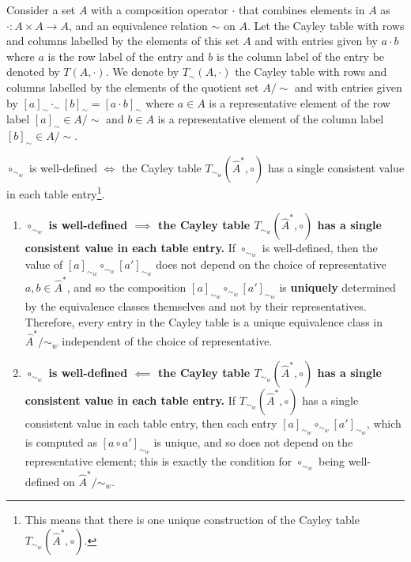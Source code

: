 Consider a set $A$ with a composition operator $\cdot$ that combines elements in $A$ as $\cdot: A \times A \to A$, and an equivalence relation $\sim$ on $A$.
Let the Cayley table with rows and columns labelled by the elements of this set $A$ and with entries given by $a \cdot b$ where $a$ is the row label of the entry and $b$ is the column label of the entry be denoted by $T(A, \cdot)$.
We denote by $T_{\sim}(A, \cdot)$ the Cayley table with rows and columns labelled by the elements of the quotient set $A/\sim$ and with entries given by $[a]_{\sim} \cdot_{\sim} [b]_{\sim} = [a \cdot b]_{\sim}$ where $a \in A$ is a representative element of the row label $[a]_{\sim} \in A/\sim$ and $b \in A$ is a representative element of the column label $[b]_{\sim} \in A/\sim$.


\begin{propositionE}\label{prp:local_sim_well_defined_means_single_unique_Cayley_table}
    $\circ_{\sim_{w}}$ is well-defined $\iff$ the Cayley table $T_{\sim_{w}}(\hat{A}^{*}, \circ)$ has a single consistent value in each table entry\footnote{
    This means that there is one unique construction of the Cayley table $T_{\sim_{w}}(\hat{A}^{*}, \circ)$.
    }.
\end{propositionE}
\begin{proofE}
\begin{enumerate}[(1)]
    \item \textbf{$\circ_{\sim_{w}}$ is well-defined $\implies$ the Cayley table $T_{\sim_{w}}(\hat{A}^{*}, \circ)$ has a single consistent value in each table entry.}
    If $\circ_{\sim_{w}}$ is well-defined, then the value of $[a]_{\sim_{w}} \circ_{\sim_{w}} [a']_{\sim_{w}}$ does not depend on the choice of representative $a, b \in \hat{A}^{*}$, and so the composition $[a]_{\sim_{w}} \circ_{\sim_{w}} [a']_{\sim_{w}}$ is \textbf{uniquely} determined by the equivalence classes themselves and not by their representatives.
    Therefore, every entry in the Cayley table is a unique equivalence class in $\hat{A}^{*}/\sim_{w}$ independent of the choice of representative.

    \item \textbf{$\circ_{\sim_{w}}$ is well-defined $\impliedby$ the Cayley table $T_{\sim_{w}}(\hat{A}^{*}, \circ)$ has a single consistent value in each table entry.}
    If $T_{\sim_{w}}(\hat{A}^{*}, \circ)$ has a single consistent value in each table entry, then each entry $[a]_{\sim_{w}} \circ_{\sim_{w}} [a']_{\sim_{w}}$, which is computed as $[a \circ a']_{\sim_{w}}$ is unique, and so does not depend on the representative element; this is exactly the condition for $\circ_{\sim_{w}}$ being well-defined on $\hat{A}^{*}/\sim_{w}$.
\end{enumerate}
\end{proofE}

